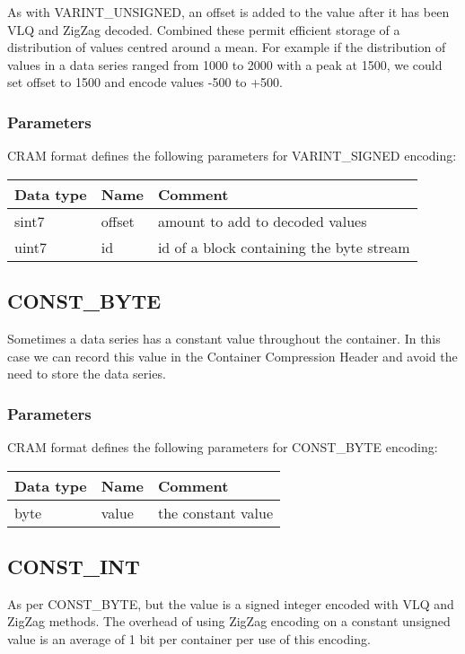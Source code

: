 \documentclass[a4paper]{article}
\begin{document}
As with VARINT\_UNSIGNED, an offset is added to the value after it has
been VLQ and ZigZag decoded.  Combined these permit efficient storage
of a distribution of values centred around a mean.  For example if
the distribution of values in a data series ranged from 1000 to 2000
with a peak at 1500, we could set offset to 1500 and encode values
-500 to +500.

\subsubsection*{Parameters}

CRAM format defines the following parameters for VARINT\_SIGNED encoding: 

\begin{tabular}{|>{\raggedright}p{100pt}|>{\raggedright}p{100pt}|>{\raggedright}p{230pt}|}
\hline
\textbf{Data type} & \textbf{Name} & \textbf{Comment}
\tabularnewline
\hline
sint7 & offset & amount to add to decoded values\tabularnewline
\hline
uint7 & id & id of a block containing the byte stream\tabularnewline
\hline
\end{tabular}


\subsection{CONST\_BYTE}

Sometimes a data series has a constant value throughout the
container.  In this case we can record this value in the Container
Compression Header and avoid the need to store the data series.

\subsubsection*{Parameters}

CRAM format defines the following parameters for CONST\_BYTE encoding: 

\begin{tabular}{|>{\raggedright}p{100pt}|>{\raggedright}p{100pt}|>{\raggedright}p{230pt}|}
\hline
\textbf{Data type} & \textbf{Name} & \textbf{Comment}
\tabularnewline
\hline
byte & value & the constant value\tabularnewline
\hline
\end{tabular}

\subsection{CONST\_INT}

As per CONST\_BYTE, but the value is a signed integer encoded with
VLQ and ZigZag methods.
The overhead of using ZigZag encoding on a constant unsigned value is
an average of 1 bit per container per use of this encoding.
\end{document}
